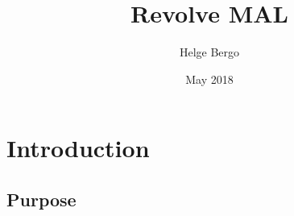 \documentclass{article}
\title{Revolve MAL}
\author{Helge Bergo}
\date{May 2018}
\begin{document}


\newpage
\section{Introduction}

\subsection{Purpose}
\end{document}
